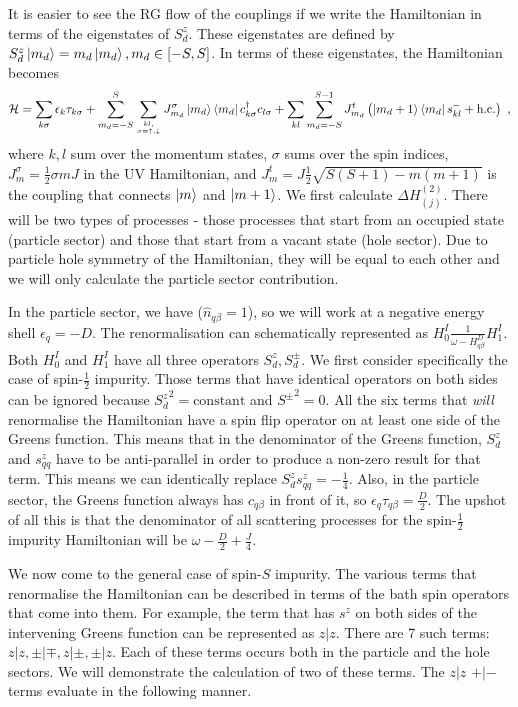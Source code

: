 \documentclass[12pt]{iopart}
\begin{document}
It is easier to see the RG flow of the couplings if we write the Hamiltonian in terms of the eigenstates of \(S_d^z\). These eigenstates are defined by \(S_d^z\ket{m_d} = m_d\ket{m_d}, m_d \in \left[-S, S\right]\). In terms of these eigenstates, the Hamiltonian becomes
\begin{eqnarray}
	\label{H_spin_S}
	\mathcal{H} = \sum_{k\sigma}\epsilon_{k}\tau_{k\sigma} + \sum_{m_d=-S}^S \sum_{kl,\atop{\sigma=\uparrow,\downarrow}} J^\sigma_{m_d} \ket{m_d}\bra{m_d} c^\dagger_{k \sigma}c_{l \sigma} + \sum_{kl} \sum_{m_d=-S}^{S-1} J^t_{m_d} \left(\ket{m_d+1}\bra{m_d} s^-_{kl}  + \text{h.c.}\right)~,
\end{eqnarray}
where \(k,l\) sum over the momentum states, \(\sigma\) sums over the spin indices, \(J^\sigma_m = \frac{1}{2} \sigma m J\) in the UV Hamiltonian, and \(J^t_{m} = J\frac{1}{2}\sqrt{S(S+1) - m(m+1)}\) is the coupling that connects \(\ket{m}\) and \(\ket{m+1}\). We first calculate \(\Delta H^{(2)}_{(j)}\). There will be two types of processes - those processes that start from an occupied state (particle sector) and those that start from a vacant state (hole sector). Due to particle hole symmetry of the Hamiltonian, they will be equal to each other and we will only calculate the particle sector contribution. 

In the particle sector, we have (\(\hat n_{q\beta}=1\)), so we will work at a negative energy  shell \(\epsilon_q = -D\). The renormalisation can schematically represented as \(H^I_0 \frac{1}{\omega - H^D_{q\beta}} H^I_1\). Both \(H^I_0\) and \(H^I_1\) have all three operators \(S_d^z, S_d^\pm\). We first consider specifically the case of spin-\(\frac{1}{2}\) impurity. Those terms that have identical operators on both sides can be ignored because \({S_d^z}^2 = \text{constant}\) and \({S^\pm}^2 = 0\). All the six terms that \textit{will} renormalise the Hamiltonian have a spin flip operator on at least one side of the Greens function. This means that in the denominator of the Greens function, \(S_d^z\) and \(s^z_{qq}\) have to be anti-parallel in order to produce a non-zero result for that term. This means we can identically replace \(S_d^z s^z_{qq} = -\frac{1}{4}\). Also, in the particle sector, the Greens function always has \(c_{q\beta}\) in front of it, so \(\epsilon_q \tau_{q\beta} = \frac{D}{2}\). The upshot of all this is that the denominator of all scattering processes for the spin-\(\frac{1}{2}\) impurity Hamiltonian will be \(\omega - \frac{D}{2} + \frac{J}{4}\).

We now come to the general case of spin-\(S\) impurity. The various terms that renormalise the Hamiltonian can be described in terms of the bath spin operators that come into them. For example, the term that has \(s^z\) on both sides of the intervening Greens function can be represented as \(z|z\). There are 7 such terms: \(z|z, \pm|\mp, z|\pm, \pm|z\). Each of these terms occurs both in the particle and the hole sectors. We will demonstrate the calculation of two of these terms. The \(z|z\) \(+|-\) terms evaluate in the following manner.
\end{document}

